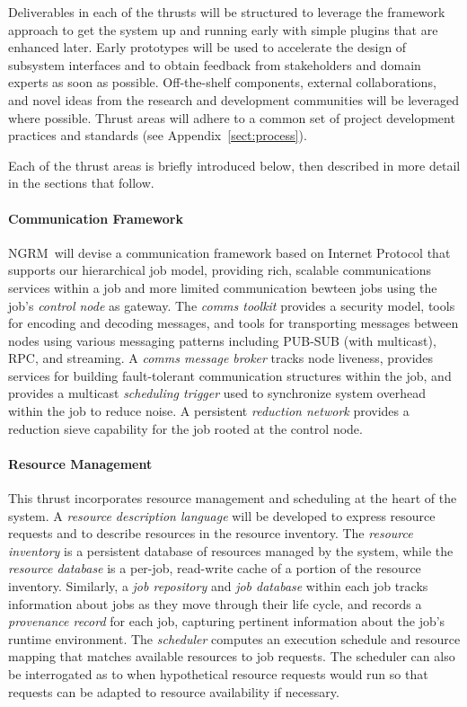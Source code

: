 \documentclass{article}
\newcommand{\ngrm}{NGRM}
\begin{document}
Deliverables in each of the thrusts will be structured 
to leverage the framework approach to get the system up and running
early with simple plugins that are enhanced later.
Early prototypes will be used to accelerate the design of subsystem
interfaces and to obtain feedback from stakeholders and domain experts
as soon as possible.
Off-the-shelf components, external collaborations, and novel ideas from
the research and development communities will be leveraged where possible.
Thrust areas will adhere to a common set of project development practices
and standards (see Appendix~\ref{sect:process}).

Each of the thrust areas is briefly introduced below, then described in
more detail in the sections that follow.

\paragraph{Communication Framework}
\ngrm\ will devise a communication framework based on Internet Protocol
that supports our hierarchical job model, providing rich, scalable
communications services
within a job and more limited communication bewteen jobs using
the job's {\em control node} as gateway.
The {\em comms toolkit} provides a security model, tools for
encoding and decoding messages, and tools for transporting messages between
nodes using various messaging patterns including PUB-SUB (with multicast),
RPC, and streaming.
A {\em comms message broker} tracks node liveness, provides services for
building fault-tolerant communication structures within the job,
and provides a multicast {\em scheduling trigger} used to synchronize
system overhead within the job to reduce noise.
A persistent {\em reduction network}
provides a reduction sieve capability for the job rooted at the control node.

\paragraph{Resource Management}
This thrust incorporates resource management and scheduling at the heart of 
the system.  A {\em resource description language} will be developed to
express resource requests and to describe resources in the resource inventory.
The {\em resource inventory} is a persistent database of resources managed
by the system, while the {\em resource database} is a per-job, read-write
cache of a portion of the resource inventory.
Similarly, a {\em job repository} and {\em job database} within each job
tracks information about jobs as they move through their life cycle,
and records a {\em provenance record} for each job, capturing pertinent
information about the job's runtime environment.
The {\em scheduler} computes an execution schedule and resource mapping
that matches available resources to job requests.  The scheduler can
also be interrogated as to when hypothetical resource requests would
run so that requests can be adapted to resource availability if necessary.
\end{document}
